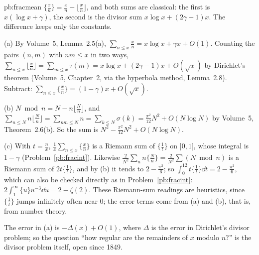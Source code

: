\begin{solution}{pb:fracmean}
\idea $\{\frac xn\}=\frac xn-\lfloor\frac xn\rfloor$, and both sums are classical: the first is $x(\log x+\gamma)$, the second is the
divisor sum $x\log x+(2\gamma-1)x$. The difference keeps only the constants.

\writeup (a) By Volume~5, Lemma~2.5(a), $\sum_{n\le x}\frac xn=x\log x+\gamma x+O(1)$. Counting the pairs $(n,m)$ with $nm\le x$ in two ways,
$\sum_{n\le x}\lfloor\frac xn\rfloor=\sum_{m\le x}\tau(m)=x\log x+(2\gamma-1)x+O(\sqrt x)$ by Dirichlet's theorem (Volume~5, Chapter~2, via the hyperbola
method, Lemma~2.8). Subtract: $\sum_{n\le x}\{\frac xn\}=(1-\gamma)x+O(\sqrt x)$.

(b) $N\bmod n=N-n\lfloor\frac Nn\rfloor$, and $\sum_{n\le N}n\lfloor\frac Nn\rfloor=\sum_{nm\le N}n=\sum_{k\le N}\sigma(k)=\frac{\pi^2}{12}N^2+O(N\log N)$ by Volume~5,
Theorem~2.6(b). So the sum is $N^2-\frac{\pi^2}{12}N^2+O(N\log N)$.

(c) With $t=\frac nx$, $\frac1x\sum_{n\le x}\{\frac xn\}$ is a Riemann sum of $\{\frac1t\}$ on $]0,1]$, whose integral is $1-\gamma$ (Problem~\ref{pb:fracint}). Likewise
$\frac2{N^2}\sum_nn\{\frac Nn\}=\frac2{N^2}\sum(N\bmod n)$ is a Riemann sum of $2t\{\frac1t\}$, and by (b) it tends to $2-\frac{\pi^2}6$; so
$\int_0^12t\{\frac1t\}\dd t=2-\frac{\pi^2}6$, which can also be checked directly as in Problem~\ref{pb:fracint}: $2\int_1^\infty\{u\}u^{-3}\dd u=2-\zeta(2)$.
These Riemann-sum readings are heuristics, since $\{\frac1t\}$ jumps infinitely often near $0$; the error terms come from (a) and (b),
that is, from number theory.

\leads The error in (a) is $-\Delta(x)+O(1)$, where $\Delta$ is the error in Dirichlet's divisor problem; so the question ``how regular
are the remainders of $x$ modulo $n$?'' is the divisor problem itself, open since 1849.
\end{solution}

